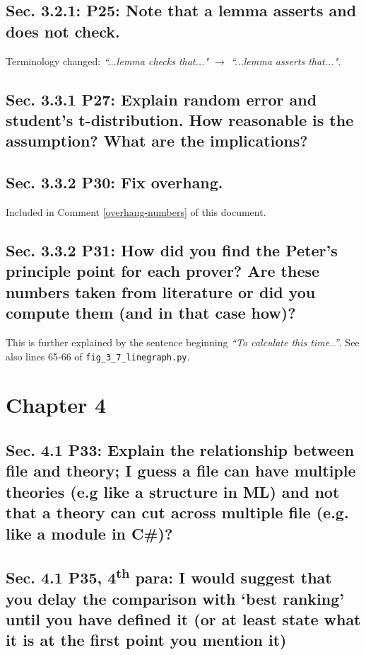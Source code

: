 \documentclass[]{article}
\newcommand{\ts}{\textsuperscript}
\begin{document}
\subsection{Sec. 3.2.1: P25: Note that a lemma asserts and does not check.}

Terminology changed: \emph{``...lemma checks that..." $\rightarrow$ ``...lemma asserts that..."}.

\subsection{Sec. 3.3.1 P27: Explain random error and student's t-distribution. How reasonable is the assumption? What are the implications?}

\subsection{Sec. 3.3.2 P30: Fix overhang.}

Included in Comment \ref{overhang-numbers} of this document.

\subsection{Sec. 3.3.2 P31: How did you find the Peter's principle point for each prover? Are these numbers taken from literature or did you compute them (and in that case how)?}

This is further explained by the sentence beginning \emph{``To calculate this time..''}. See also lines 65-66 of \texttt{fig\_3\_7\_linegraph.py}.

\section{Chapter 4}

\subsection{Sec. 4.1 P33: Explain the relationship between file and theory; I guess a file can have multiple theories (e.g like a structure in ML) and not that a theory can cut across multiple file (e.g. like a module in C\#)?}

\subsection{Sec. 4.1 P35, 4\ts{th} para: I would suggest that you delay the comparison with `best ranking' until you have defined it (or at least state what it is at the first point you mention it)}
\end{document}
